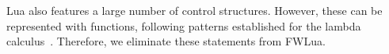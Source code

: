 Lua also features a large number of control structures.
However, these can be represented with functions,
following patterns established for the lambda calculus~\cite{aaa}.
Therefore, we eliminate these statements from FWLua.







